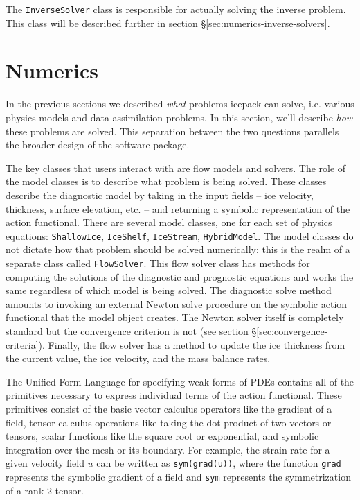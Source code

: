\documentclass[journal abbreviation, manuscript]{copernicus}
\begin{document}
The \texttt{InverseSolver} class is responsible for actually solving the inverse problem.
This class will be described further in section \S\ref{sec:numerics-inverse-solvers}.


\section{Numerics}

In the previous sections we described \emph{what} problems icepack can solve, i.e. various physics models and data assimilation problems.
In this section, we'll describe \emph{how} these problems are solved.
This separation between the two questions parallels the broader design of the software package.

The key classes that users interact with are flow models and solvers.
The role of the model classes is to describe what problem is being solved.
These classes describe the diagnostic model by taking in the input fields -- ice velocity, thickness, surface elevation, etc. -- and returning a symbolic representation of the action functional.
There are several model classes, one for each set of physics equations: \texttt{ShallowIce}, \texttt{IceShelf}, \texttt{IceStream}, \texttt{HybridModel}.
The model classes do not dictate how that problem should be solved numerically; this is the realm of a separate class called \texttt{FlowSolver}.
This flow solver class has methods for computing the solutions of the diagnostic and prognostic equations and works the same regardless of which model is being solved.
The diagnostic solve method amounts to invoking an external Newton solve procedure on the symbolic action functional that the model object creates.
The Newton solver itself is completely standard but the convergence criterion is not (see section \S\ref{sec:convergence-criteria}).
Finally, the flow solver has a method to update the ice thickness from the current value, the ice velocity, and the mass balance rates.

The Unified Form Language for specifying weak forms of PDEs contains all of the primitives necessary to express individual terms of the action functional.
These primitives consist of the basic vector calculus operators like the gradient of a field, tensor calculus operations like taking the dot product of two vectors or tensors, scalar functions like the square root or exponential, and symbolic integration over the mesh or its boundary.
For example, the strain rate for a given velocity field $u$ can be written as \texttt{sym(grad(u))}, where the function \texttt{grad} represents the symbolic gradient of a field and \texttt{sym} represents the symmetrization of a rank-2 tensor.
\end{document}
